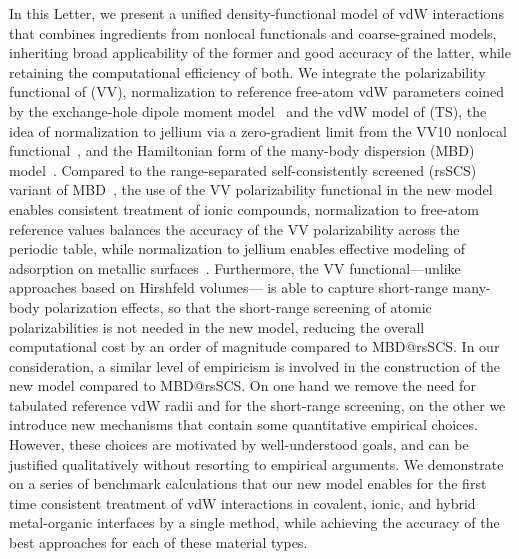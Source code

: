 In this Letter, we present a unified density-functional model of vdW interactions that combines ingredients from nonlocal functionals and coarse-grained models, inheriting broad applicability of the former and good accuracy of the latter, while retaining the computational efficiency of both.
We integrate the polarizability functional of \citet{VydrovPRA10} (VV), normalization to reference free-atom vdW parameters coined by the exchange-hole dipole moment model~\citep{BeckeJCP06} and the vdW model of \citet{TkatchenkoPRL09} (TS), the idea of normalization to jellium via a zero-gradient limit from the VV10 nonlocal functional~\citep{VydrovJCP10a}, and the Hamiltonian form of the many-body dispersion (MBD) model~\citep{TkatchenkoJCP13}.
Compared to the range-separated self-consistently screened (rsSCS) variant of MBD~\citep{AmbrosettiJCP14}, the use of the VV polarizability functional in the new model enables consistent treatment of ionic compounds, normalization to free-atom reference values balances the accuracy of the VV polarizability across the periodic table, while normalization to jellium enables effective modeling of adsorption on metallic surfaces~\citep{RuizPRL12}.
Furthermore, the VV functional---unlike approaches based on Hirshfeld volumes---
is able to capture short-range many-body polarization effects, so that the short-range screening of atomic polarizabilities is not needed in the new model, reducing the overall computational cost by an order of magnitude compared to MBD@rsSCS\@.
In our consideration, a similar level of empiricism is involved in the construction of the new model compared to MBD@rsSCS\@.
On one hand we remove the need for tabulated reference vdW radii and for the short-range screening, on the other we introduce new mechanisms that contain some quantitative empirical choices.
However, these choices are motivated by well-understood goals, and can be justified qualitatively without resorting to empirical arguments.
We demonstrate on a series of benchmark calculations that our new model enables for the first time consistent treatment of vdW interactions in covalent, ionic, and hybrid metal-organic interfaces by a single method, while achieving the accuracy of the best approaches for each of these material types.



